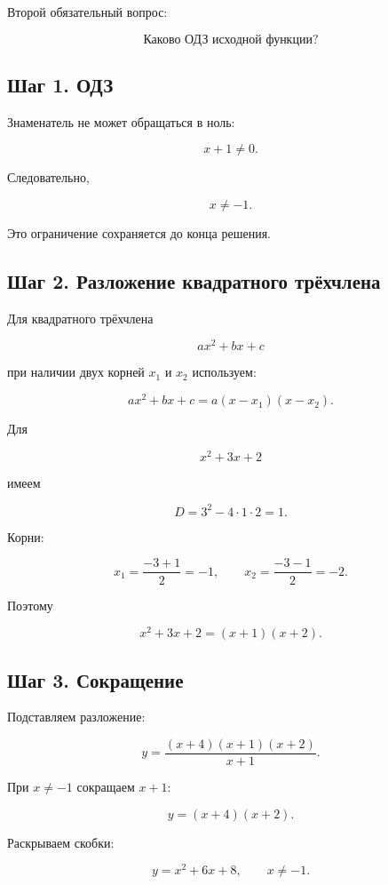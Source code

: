 \documentclass[a4paper,12pt]{article}
\begin{document}
Второй обязательный вопрос:

\[
\boxed{\text{Каково ОДЗ исходной функции?}}
\]

\subsection{Шаг 1. ОДЗ}

Знаменатель не может обращаться в ноль:

\[
x+1\ne0.
\]

Следовательно,

\[
\boxed{x\ne-1}.
\]

Это ограничение сохраняется до конца решения.

\subsection{Шаг 2. Разложение квадратного трёхчлена}

Для квадратного трёхчлена

\[
ax^2+bx+c
\]

при наличии двух корней \(x_1\) и \(x_2\) используем:

\[
\boxed{
ax^2+bx+c=a(x-x_1)(x-x_2)
}.
\]

Для

\[
x^2+3x+2
\]

имеем

\[
D=3^2-4\cdot1\cdot2=1.
\]

Корни:

\[
x_1=\frac{-3+1}{2}=-1,
\qquad
x_2=\frac{-3-1}{2}=-2.
\]

Поэтому

\[
x^2+3x+2=(x+1)(x+2).
\]

\subsection{Шаг 3. Сокращение}

Подставляем разложение:

\[
y=
\frac{(x+4)(x+1)(x+2)}{x+1}.
\]

При \(x\ne-1\) сокращаем \(x+1\):

\[
y=(x+4)(x+2).
\]

Раскрываем скобки:

\[
\boxed{
y=x^2+6x+8,
\qquad x\ne-1.
}
\]
\end{document}

